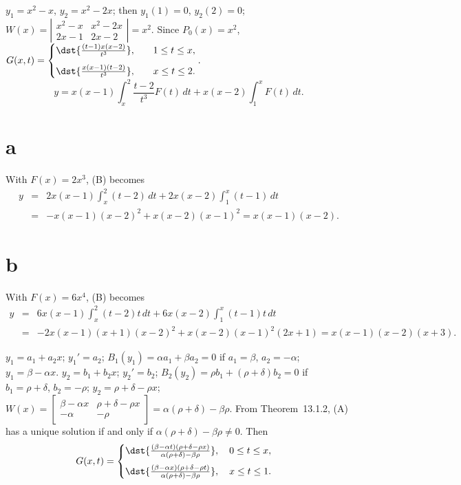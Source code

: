 \documentclass[dvips]{book}
\renewcommand{\exer}[1]{\par\medskip\;\noindent{\color{red}\bf #1.}}
\numberwithin{example}{section}
\numberwithin{equation}{section}
\numberwithin{theorem}{section}
\numberwithin{table}{section}
\numberwithin{figure}{section}
\begin{document}
\exer{13.1.24} $y_{1}=x^{2}-x$, $y_{2}=x^{2}-2x$; then $y_{1}(1)=0$,
$y_{2}(2)=0$;
$W(x)=
\left|\begin{array}{cccccc}
x^{2}-x &x^{2}-2x\\2x-1&2x-2
\end{array}\right|=x^{2}$.
Since $P_{0}(x)=x^{2}$,
$G(x,t)=
\begin{cases}
\dst{\frac{(t-1)x(x-2)}{t^{3}}}, &\quad 1\le t\le x,\\[.1in]
\dst{\frac{x(x-1)(t-2)}{t^{3}}}, &\quad x\le t\le 2.
\end{cases}.$
\begin{equation}
y=x(x-1)\int_{x}^{2}\frac{t-2}{t^{3}}F(t)\,dt+x(x-2)\int_{1}^{x}F(t)\,dt.
\tag{B}
\end{equation}

\part{a} With $F(x)=2x^{3}$, (B) becomes
\begin{eqnarray*}
y&=&2x(x-1)\int_{x}^{2}(t-2)\,dt +2x(x-2)\int_{1}^{x}(t-1)\,dt\\
&=&-x(x-1)(x-2)^{2}+x(x-2)(x-1)^{2}=x(x-1)(x-2).
\end{eqnarray*}

\part{b} With $F(x)=6x^{4}$, (B) becomes
\begin{eqnarray*}
y&=&6x(x-1)\int_{x}^{2}(t-2)t\,dt +6x(x-2)\int_{1}^{x}(t-1)t\,dt\\
&=&-2x(x-1)(x+1)(x-2)^{2}+x(x-2)(x-1)^{2}(2x+1)=x(x-1)(x-2)(x+3).
\end{eqnarray*}


\exer{13.1.26} $y_{1}=a_{1}+a_{2}x$; $y_{1}'=a_{2}$;
$B_{1}(y_{1})=\alpha a_{1}+\beta a_{2}=0$ if $a_{1}=\beta$,
$a_{2}=-\alpha$; $y_{1}=\beta-\alpha  x$.
$y_{2}=b_{1}+b_{2}x$;
$y_{2}'=b_{2}$;
$B_{2}(y_{2})=\rho b_{1}+(\rho+\delta)b_{2}=0$ if $b_{1}=\rho+\delta$,
$b_{2}=-\rho$; $y_{2}=\rho+\delta-\rho x$;
$W(x)=
\left[\begin{array}{ccccccc}
\beta-\alpha x&\rho+\delta-\rho x\\-\alpha&-\rho
\end{array}\right]
=\alpha(\rho+\delta)-\beta\rho$. From Theorem~13.1.2, (A) has a unique
solution if and only if $\alpha(\rho+\delta)-\beta\rho\ne0$. Then
$$
G(x,t)=
\begin{cases}
\dst{\frac{(\beta-\alpha t)(\rho+\delta-\rho x)}
{\alpha(\rho+\delta)-\beta\rho}}, \quad 0\le t\le x,\\[.1in]
\dst{\frac{(\beta-\alpha x)(\rho+\delta-\rho t)}
{\alpha(\rho+\delta)-\beta\rho}}, \quad x\le t\le 1.
\end{cases}
$$
\end{document}
